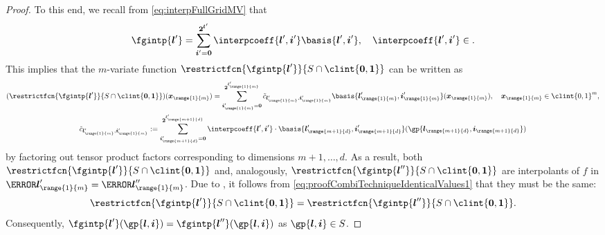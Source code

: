 \begin{proof}
  To this end, we recall from \eqref{eq:interpFullGridMV} that
  \begin{equation}
    \fgintp{\*l'}
    = \sum_{\*i'=\*0}^{\*2^{\*l'}} \interpcoeff{\*l',\*i'}
    \basis{\*l',\*i'},\quad
    \interpcoeff{\*l',\*i'} \in \real.
  \end{equation}
  This implies that the $m$-variate function
  $\restrictfcn{\fgintp{\*l'}}{S \cap \clint{\*0, \*1}}$ can be written as
  \begin{subequations}
    \begin{gather}
      (\restrictfcn{\fgintp{\*l'}}{S \cap \clint{\*0, \*1}})(\*x_{\range{1}{m}})
      = \sum_{\*i'_{\range{1}{m}}=\*0}^{\*2^{\*l'_{\range{1}{m}}}}
      \interpcoefftilde{\*l'_{\range{1}{m}},\*i'_{\range{1}{m}}}
      \basis{\*l'_{\range{1}{m}},\*i'_{\range{1}{m}}}(\*x_{\range{1}{m}}),\quad
      \*x_{\range{1}{m}} \in \clint{0, 1}^m,\\
      \interpcoefftilde{\*l'_{\range{1}{m}},\*i'_{\range{1}{m}}}
      := \sum_{\*i'_{\range{m+1}{d}}=\*0}^{\*2^{\*l'_{\range{m+1}{d}}}}
      \interpcoeff{\*l',\*i'} \cdot
      \basis{\*l'_{\range{m+1}{d}},\*i'_{\range{m+1}{d}}}%
      (\gp{\*l_{\range{m+1}{d}},\*i_{\range{m+1}{d}}})
    \end{gather}
  \end{subequations}
  by factoring out tensor product factors corresponding to dimensions
  $m + 1, \dotsc, d$.
  As a result,
  both $\restrictfcn{\fgintp{\*l'}}{S \cap \clint{\*0, \*1}}$
  and, analogously,
  $\restrictfcn{\fgintp{\*l''}}{S \cap \clint{\*0, \*1}}$
  are interpolants of $f$ in
  $\ns{\*l'_{\range{1}{m}}} = \ns{\*l''_{\range{1}{m}}}$.
  Due to ,
  it follows from \eqref{eq:proofCombiTechniqueIdenticalValues1}
  that they must be the same:
  \begin{equation}
    \restrictfcn{\fgintp{\*l'}}{S \cap \clint{\*0, \*1}}
    = \restrictfcn{\fgintp{\*l''}}{S \cap \clint{\*0, \*1}}.
  \end{equation}
  Consequently, $\fgintp{\*l'}(\gp{\*l,\*i}) = \fgintp{\*l''}(\gp{\*l,\*i})$
  as $\gp{\*l,\*i} \in S$.
\end{proof}

\lemmaCombiTechniqueCharacterization*

